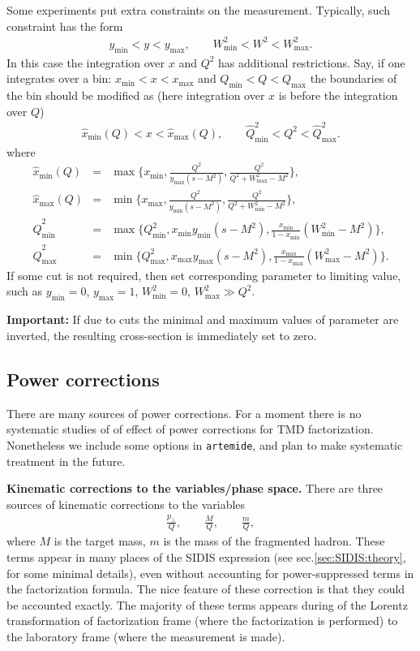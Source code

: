 \documentclass[prd,nofootinbib,eqsecnum,final]{revtex4}
\newcommand{\nn}{\nonumber}
\renewcommand{\(}{\left(}
\renewcommand{\)}{\right)}
\renewcommand{\[}{\left[}
\renewcommand{\]}{\right]}
\begin{document}
Some experiments put extra constraints on the measurement. Typically, such constraint has the form
\begin{eqnarray}
y_{\min}<y<y_{\max},\qquad W^2_{\min}<W^2<W_{\max}^2.
\end{eqnarray}
In this case the integration over $x$ and $Q^2$ has additional restrictions. Say, if one integrates over a bin: $x_{\min}<x<x_{\max}$ and $Q_{\min}<Q<Q_{\max}$ the boundaries of the bin should be modified as (here integration over $x$ is before the integration over $Q$)
\begin{eqnarray}
\hat x_{\text{min}}(Q)<x<\hat x_{\text{max}}(Q),
\qquad
\hat Q^2_{\text{min}}<Q^2<\hat Q^2_{\text{max}}.
\end{eqnarray}
where
\begin{eqnarray*}
\hat x_{\text{min}}(Q)&=&\max\{x_{\text{min}},\frac{Q^2}{y_{\text{max}}(s-M^2)},\frac{Q^2}{Q^2+W^2_{\text{max}}-M^2}\},
\\
\hat x_{\text{max}}(Q)&=&\min\{x_{\text{max}},\frac{Q^2}{y_{\text{min}}(s-M^2)},\frac{Q^2}{Q^2+W^2_{\text{min}}-M^2}\},
\\
\hat Q^2_{\text{min}}&=&\max\{Q^2_{\text{min}},x_{\text{min}}y_{\text{min}}(s-M^2),\frac{x_{\text{min}}}{1-x_{\text{min}}}(W^2_{\text{min}}-M^2)\},
\\
\hat Q^2_{\text{max}}&=&\min\{Q^2_{\text{max}},x_{\text{max}}y_{\text{max}}(s-M^2),\frac{x_{\text{max}}}{1-x_{\text{max}}}(W^2_{\text{max}}-M^2)\}.
\end{eqnarray*}
If some cut is not required, then set corresponding parameter to limiting value, such as $y_{\min}=0$, $y_{\max}=1$, $W^2_{\min}=0$, $W^2_{\max}\gg Q^2$.

\textbf{Important:} If due to cuts the minimal and maximum values of parameter are inverted, the resulting cross-section is immediately set to zero.

\subsection{Power corrections}

There are many sources of power corrections. For a moment there is no systematic studies of of effect of power corrections for TMD factorization. Nonetheless we include some options in \texttt{artemide}, and plan to make systematic treatment in the future.

\textbf{Kinematic corrections to the variables/phase space.} There are three sources of kinematic corrections to the variables
\begin{eqnarray}\nn
\frac{p_\perp}{Q},\qquad \frac{M}{Q},\qquad \frac{m}{Q},
\end{eqnarray}
where $M$ is the target mass, $m$ is the mass of the fragmented hadron. These terms appear in many places of the SIDIS expression (see sec.\ref{sec:SIDIS:theory}, for some minimal details), even without accounting for power-suppressed terms in the factorization formula. The nice feature of these correction is that they could be accounted exactly. The majority of these terms appears during of the Lorentz transformation of factorization frame (where the factorization is performed) to the laboratory frame (where the measurement is made).
\end{document}
